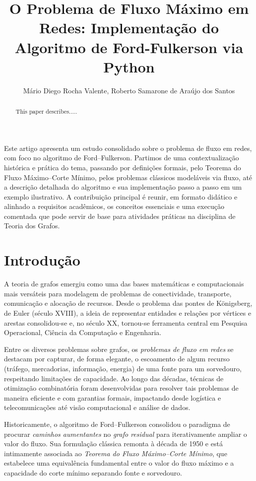\documentclass[12pt]{article}
\title{O Problema de Fluxo Máximo em Redes: Implementação do Algoritmo de Ford-Fulkerson via Python}
\author{Mário Diego Rocha Valente\inst{1}, Roberto Samarone de Araújo dos Santos\inst{2}}
\begin{document}
 

\maketitle

\begin{abstract}
  This paper describes.....
\end{abstract}
     
\begin{resumo} 
  Este artigo apresenta um estudo consolidado sobre o problema de fluxo em redes, com foco no algoritmo de Ford–Fulkerson. Partimos de uma contextualização histórica e prática do tema, passando por definições formais, pelo Teorema do Fluxo Máximo–Corte Mínimo, pelos problemas clássicos modeláveis via fluxo, até a descrição detalhada do algoritmo e sua implementação passo a passo em um exemplo ilustrativo. A contribuição principal é reunir, em formato didático e alinhado a requisitos acadêmicos, os conceitos essenciais e uma execução comentada que pode servir de base para atividades práticas na disciplina de Teoria dos Grafos.
\end{resumo}

\newpage
\section{Introdução}

A teoria de grafos emergiu como uma das bases matemáticas e computacionais mais versáteis para modelagem de problemas de conectividade, transporte, comunicação e alocação de recursos. Desde o problema das pontes de Königsberg, de Euler (século XVIII), a ideia de representar entidades e relações por vértices e arestas consolidou-se e, no século XX, tornou-se ferramenta central em Pesquisa Operacional, Ciência da Computação e Engenharia.

Entre os diversos problemas sobre grafos, os \emph{problemas de fluxo em redes} se destacam por capturar, de forma elegante, o escoamento de algum recurso (tráfego, mercadorias, informação, energia) de uma fonte para um sorvedouro, respeitando limitações de capacidade. Ao longo das décadas, técnicas de otimização combinatória foram desenvolvidas para resolver tais problemas de maneira eficiente e com garantias formais, impactando desde logística e telecomunicações até visão computacional e análise de dados.

Historicamente, o algoritmo de Ford–Fulkerson consolidou o paradigma de procurar \emph{caminhos aumentantes} no \emph{grafo residual} para iterativamente ampliar o valor do fluxo. Sua formulação clássica remonta à década de 1950 e está intimamente associada ao \emph{Teorema do Fluxo Máximo–Corte Mínimo}, que estabelece uma equivalência fundamental entre o valor do fluxo máximo e a capacidade do corte mínimo separando fonte e sorvedouro.
\end{document}
